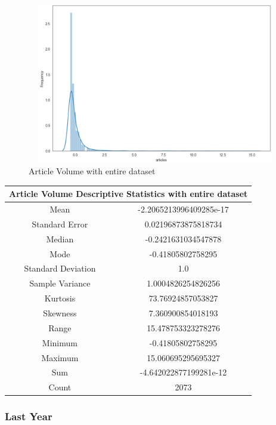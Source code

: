 \begin{figure}[h!]
    \centering
    \includegraphics[width=15cm,height=7cm,keepaspectratio]{resultsEvaluation/articleDescMax.png}
    \caption{Article Volume with entire dataset}
    \label{fig:appendix_articleDescMax}
\end{figure}
\begin{center}
\begin{tabular}{ c c }
\hline
\multicolumn{2}{|c|}{Article Volume Descriptive Statistics with entire dataset} \\
\hline
Mean & -2.2065213996409285e-17 \\
Standard Error & 0.02196873875818734 \\
Median & -0.2421631034547878 \\
Mode & -0.41805802758295 \\
Standard Deviation & 1.0 \\
Sample Variance & 1.0004826254826256 \\
Kurtosis & 73.76924857053827 \\
Skewness & 7.360900854018193 \\
Range & 15.478753323278276 \\
Minimum & -0.41805802758295 \\
Maximum & 15.060695295695327 \\
Sum & -4.642022877199281e-12 \\
Count & 2073
\end{tabular}
\end{center}

\subsubsection{Last Year}

